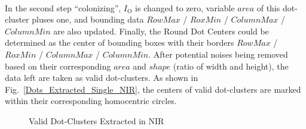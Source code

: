 \\\indent%
In the second step \enquote{colonizing},  \(I_{\text{O}}\) is changed to zero, variable \(area\) of this dot-cluster pluses one, and bounding data \(RowMax\) / \(RoxMin\) / \(ColumnMax\) / \(ColumnMin\) are also updated. %
%
Finally, the Round Dot Centers could be determined as the center of bounding boxes with their borders \(RowMax\) / \(RoxMin\) / \(ColumnMax\) / \(ColumnMin\). After potential noises being removed based on their corresponding \(area\) and \(shape\) (ratio of width and height), the data left are taken as valid dot-clusters. As shown in Fig.~\ref{Dots_Extracted_Single_NIR}, the centers of valid dot-clusters are marked within their corresponding homocentric circles.
%
 \begin{figure}[t]
\hspace*{-0.5cm}
\centering
{}
{}
%
\caption{Valid Dot-Clusters Extracted in \gls{NIR}}
\label{DotCentersExtraction}
\end{figure}
